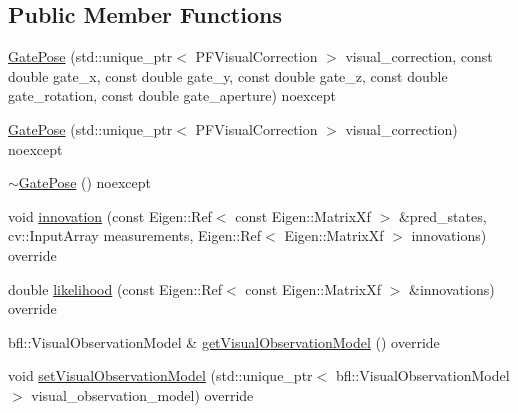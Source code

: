 \subsection*{Public Member Functions}
\begin{DoxyCompactItemize}
\item 
\hyperlink{classGatePose_a27001df58131fc1431f1a3d768698494}{Gate\+Pose} (std\+::unique\+\_\+ptr$<$ P\+F\+Visual\+Correction $>$ visual\+\_\+correction, const double gate\+\_\+x, const double gate\+\_\+y, const double gate\+\_\+z, const double gate\+\_\+rotation, const double gate\+\_\+aperture) noexcept
\item 
\hyperlink{classGatePose_a27e224f41699efe5949e2fb876b1d9ee}{Gate\+Pose} (std\+::unique\+\_\+ptr$<$ P\+F\+Visual\+Correction $>$ visual\+\_\+correction) noexcept
\item 
\hyperlink{classGatePose_acea85773116a379f108b7c53152d9420}{$\sim$\+Gate\+Pose} () noexcept
\item 
void \hyperlink{classGatePose_a00607a4325dcfb7a02bda7490b65d25c}{innovation} (const Eigen\+::\+Ref$<$ const Eigen\+::\+Matrix\+Xf $>$ \&pred\+\_\+states, cv\+::\+Input\+Array measurements, Eigen\+::\+Ref$<$ Eigen\+::\+Matrix\+Xf $>$ innovations) override
\item 
double \hyperlink{classGatePose_a939c575d5d59c8b0f3ab528edd368c0d}{likelihood} (const Eigen\+::\+Ref$<$ const Eigen\+::\+Matrix\+Xf $>$ \&innovations) override
\item 
bfl\+::\+Visual\+Observation\+Model \& \hyperlink{classGatePose_aa47f9242f039b8752675db5594350a28}{get\+Visual\+Observation\+Model} () override
\item 
void \hyperlink{classGatePose_a18ba358c801ae1a246dbee2f9780c698}{set\+Visual\+Observation\+Model} (std\+::unique\+\_\+ptr$<$ bfl\+::\+Visual\+Observation\+Model $>$ visual\+\_\+observation\+\_\+model) override
\end{DoxyCompactItemize}
